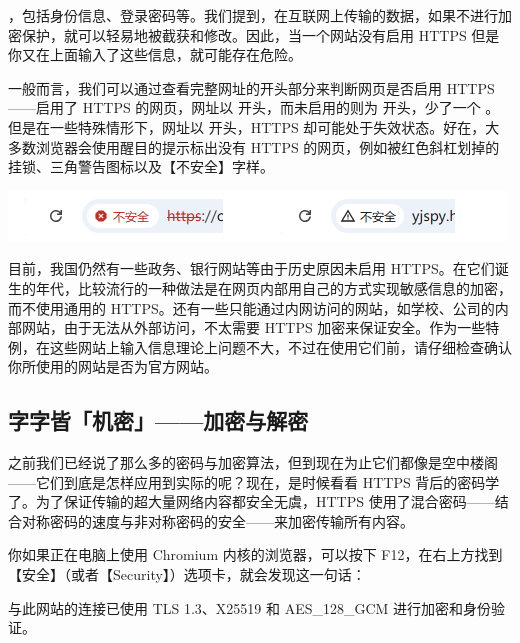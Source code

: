 \begin{warning}
  ，包括身份信息、登录密码等。我们提到，在互联网上传输的数据，如果不进行加密保护，就可以轻易地被截获和修改。因此，当一个网站没有启用 HTTPS 但是你又在上面输入了这些信息，就可能存在危险。

  一般而言，我们可以通过查看完整网址的开头部分来判断网页是否启用 HTTPS——启用了 HTTPS 的网页，网址以  开头，而未启用的则为  开头，少了一个 。但是在一些特殊情形下，网址以  开头，HTTPS 却可能处于失效状态。好在，大多数浏览器会使用醒目的提示标出没有 HTTPS 的网页，例如被红色斜杠划掉的挂锁、三角警告图标以及【不安全】字样。

  {
    \begin{center}
      \includegraphics[width=.65\textwidth]{assets/surpass/Non-https.png}
      \label{fig:Non-https}
    \end{center}
  }

  目前，我国仍然有一些政务、银行网站等由于历史原因未启用 HTTPS。在它们诞生的年代，比较流行的一种做法是在网页内部用自己的方式实现敏感信息的加密，而不使用通用的 HTTPS。还有一些只能通过内网访问的网站，如学校、公司的内部网站，由于无法从外部访问，不太需要 HTTPS 加密来保证安全。作为一些特例，在这些网站上输入信息理论上问题不大，不过在使用它们前，请仔细检查确认你所使用的网站是否为官方网站。
\end{warning}

\subsection{字字皆「机密」——加密与解密}

之前我们已经说了那么多的密码与加密算法，但到现在为止它们都像是空中楼阁——它们到底是怎样应用到实际的呢？现在，是时候看看 HTTPS 背后的密码学了。为了保证传输的超大量网络内容都安全无虞，HTTPS 使用了混合密码——结合对称密码的速度与非对称密码的安全——来加密传输所有内容。

你如果正在电脑上使用 Chromium 内核的浏览器，可以按下 F12，在右上方找到【安全】（或者【Security】）选项卡，就会发现这一句话：

\begin{quoting}
  与此网站的连接已使用 TLS 1.3、X25519 和 AES\_{}128\_{}GCM 进行加密和身份验证。
\end{quoting}

